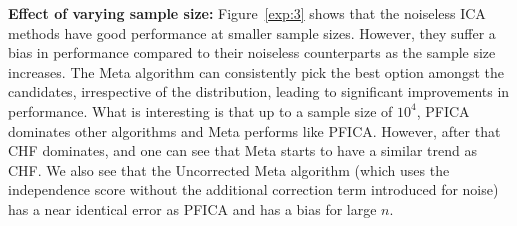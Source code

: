 \documentclass[letterpaper]{article}
\newcommand{\bb}[1]{\left(#1\right)}
\DeclareMathOperator{\poisson}{Poisson}
\begin{document}
\textbf{Effect of varying sample size:} Figure~\ref{exp:3} shows that the noiseless ICA methods have good performance at smaller sample sizes. However, they suffer a bias in performance compared to their noiseless counterparts as the sample size increases. The Meta algorithm can consistently pick the best option amongst the candidates, irrespective of the distribution, leading to significant improvements in performance. What is interesting is that up to a sample size of $10^4$, PFICA dominates other algorithms and Meta performs like PFICA. However, after that CHF dominates, and one can see that Meta starts to have a similar trend as CHF. We also see that the Uncorrected Meta algorithm (which uses the independence score without the additional correction term introduced for noise) has a near identical error as PFICA and has a bias for large $n$.
\end{document}
